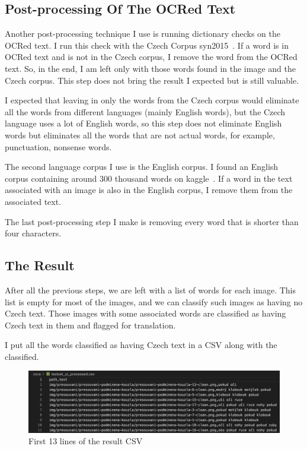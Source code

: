 \documentclass[
  digital,     %
  oneside,     %
  nosansbold,  %
  nocolorbold, %
  nolof,         %
  nolot,         %
]{fithesis4}
\begin{document}
\subsection{Post-processing Of The OCRed Text}

Another post-processing technique I use is running dictionary checks on the OCRed text. I run this check with the Czech Corpus syn2015~\cite{syn2015}. If a word is in OCRed text and is not in the Czech corpus, I remove the word from the OCRed text. So, in the end, I am left only with those words found in the image and the Czech corpus. This step does not bring the result I expected but is still valuable.

I expected that leaving in only the words from the Czech corpus would eliminate all the words from different languages (mainly English words), but the Czech language uses a lot of English words, so this step does not eliminate English words but eliminates all the words that are not actual words, for example, punctuation, nonsense words.

The second language corpus I use is the English corpus. I found an English corpus containing around 300 thousand words on kaggle~\cite{english-corpus}. If a word in the text associated with an image is also in the English corpus, I remove them from the associated text.

The last post-processing step I make is removing every word that is shorter than four characters.

\subsection{The Result}

After all the previous steps, we are left with a list of words for each image. This list is empty for most of the images, and we can classify such images as having no Czech text. Those images with some associated words are classified as having Czech text in them and flagged for translation.

I put all the words classified as having Czech text in a CSV along with the classified.

\begin{figure}[h]
\caption{First 13 lines of the result CSV}
\includegraphics[width=\textwidth]{images/result-csv.png}
\centering
\end{figure}
\end{document}
